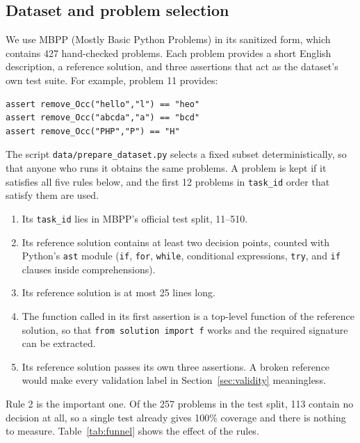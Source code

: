 \documentclass[11pt,a4paper]{article}
\begin{document}
\subsection{Dataset and problem selection}

We use MBPP (Mostly Basic Python Problems) in its sanitized form, which contains 427 hand-checked problems.
Each problem provides a short English description, a reference solution, and three assertions that act as the
dataset's own test suite. For example, problem 11 provides:

\begin{lstlisting}[style=plain]
assert remove_Occ("hello","l") == "heo"
assert remove_Occ("abcda","a") == "bcd"
assert remove_Occ("PHP","P") == "H"
\end{lstlisting}

The script \texttt{data/prepare\_dataset.py} selects a fixed subset deterministically, so that anyone who runs
it obtains the same problems. A problem is kept if it satisfies all five rules below, and the first 12 problems
in \texttt{task\_id} order that satisfy them are used.

\begin{enumerate}\itemsep2pt
  \item Its \texttt{task\_id} lies in MBPP's official test split, 11--510.
  \item Its reference solution contains at least two decision points, counted with Python's \texttt{ast}
        module (\texttt{if}, \texttt{for}, \texttt{while}, conditional expressions, \texttt{try}, and
        \texttt{if} clauses inside comprehensions).
  \item Its reference solution is at most 25 lines long.
  \item The function called in its first assertion is a top-level function of the reference solution, so that
        \texttt{from solution import f} works and the required signature can be extracted.
  \item Its reference solution passes its own three assertions. A broken reference would make every
        validation label in Section~\ref{sec:validity} meaningless.
\end{enumerate}

Rule 2 is the important one. Of the 257 problems in the test split, 113 contain no decision at all, so a single
test already gives 100\% coverage and there is nothing to measure. Table~\ref{tab:funnel} shows the effect of
the rules.
\end{document}
